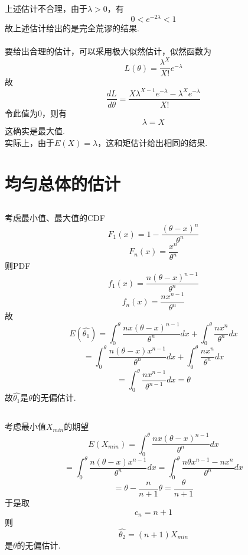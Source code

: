 \documentclass{article}
\begin{document}
\begin{CJK}{UTF8}{gbsn}
\subsection{}
上述估计不合理，由于$\lambda>0$，有
$$ 0<e^{-2\lambda}<1$$
故上述估计给出的是完全荒谬的结果.
\\\\
要给出合理的估计，可以采用极大似然估计，似然函数为
$$ L(\theta)=\frac{\lambda^{X}}{X!}e^{-\lambda}$$
故
$$ \frac{dL}{d\theta}=\frac{X\lambda^{X-1}e^{-\lambda}-\lambda^{X}e^{-\lambda}}{X!}$$
令此值为0，则有
$$ \lambda=X$$
这确实是最大值.
\\实际上，由于$E(X)=\lambda$，这和矩估计给出相同的结果.
\section{均匀总体的估计}
\subsection{}
考虑最小值、最大值的CDF
$$ F_{1}(x)=1-\frac{(\theta-x)^{n}}{\theta^{n}}$$
$$ F_{n}(x)=\frac{x^{n}}{\theta^{n}}$$
则PDF
$$ f_{1}(x)=\frac{n(\theta-x)^{n-1}}{\theta^{n}}$$
$$ f_{n}(x)=\frac{nx^{n-1}}{\theta^{n}}$$
故
$$ E(\hat{\theta_{1}})=\int_{0}^{\theta}\frac{nx(\theta-x)^{n-1}}{\theta^{n}}dx+\int_{0}^{\theta}\frac{nx^{n}}{\theta^{n}}dx$$
$$ =\int_{0}^{\theta}\frac{n(\theta-x)x^{n-1}}{\theta^{n}}dx+\int_{0}^{\theta}\frac{nx^{n}}{\theta^{n}}dx$$
$$=\int_{0}^{\theta}\frac{nx^{n-1}}{\theta^{n-1}}dx=\theta$$
故$\hat{\theta_{1}}$是$\theta$的无偏估计.
\subsection{}
考虑最小值$X_{min}$的期望
$$ E(X_{min})=\int_{0}^{\theta}\frac{nx(\theta-x)^{n-1}}{\theta^{n}}dx$$
$$ =\int_{0}^{\theta}\frac{n(\theta-x)x^{n-1}}{\theta^{n}}dx=\int_{0}^{\theta}\frac{n\theta x^{n-1}-nx^{n}}{\theta^{n}}dx$$
$$ =\theta-\frac{n}{n+1}\theta=\frac{\theta}{n+1}$$
于是取
$$ c_{n}=n+1$$
则
$$\hat{\theta_{2}}=(n+1)X_{min}$$
是$\theta$的无偏估计.

\end{CJK}
\end{document}
